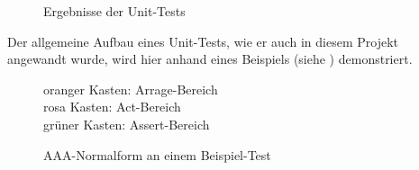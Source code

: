 \begin{figure}[ht!]
\vspace{0.25cm}
\begin{center}
\caption{Ergebnisse der Unit-Tests}
\label{fig:TestRes}
\end{center}

\vspace{0.25cm}
\end{figure}


Der allgemeine Aufbau eines Unit-Tests, wie er auch in diesem Projekt angewandt wurde, wird hier anhand eines Beispiels (siehe ) demonstriert.

\begin{figure}[ht!]
\vspace{0.25cm}
\begin{center}
\caption{AAA-Normalform an einem Beispiel-Test}
\label{fig:TestAAA}
\end{center}

\vspace{0.25cm}
oranger Kasten:	Arrage-Bereich\\
rosa Kasten: Act-Bereich\\
grüner Kasten: Assert-Bereich
\end{figure}


